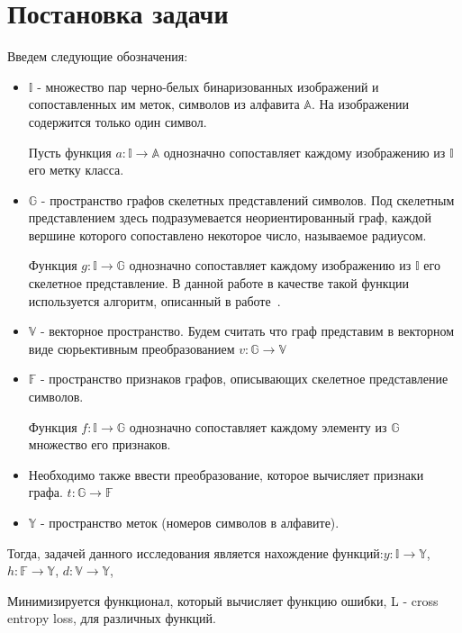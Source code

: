 \documentclass{llncs}
\begin{document}
\section{Постановка задачи}

Введем следующие обозначения: 
\begin{itemize}
\item $\mathbb{I}$ - множество пар черно-белых бинаризованных изображений и сопоставленных им меток, символов из алфавита $\mathbb{A}$. На изображении содержится только один символ. 

Пусть функция $a: \mathbb{I} \rightarrow \mathbb{A}$ однозначно сопоставляет каждому изображению из $\mathbb{I}$ его метку класса.

\item $\mathbb{G}$ - пространство графов скелетных представлений символов. Под скелетным представлением здесь подразумевается неориентированный граф, каждой вершине которого сопоставлено некоторое число, называемое радиусом.

Функция $g: \mathbb{I} \rightarrow \mathbb{G}$ однозначно сопоставляет каждому изображению из $\mathbb{I}$ его скелетное представление. В данной работе в качестве такой функции используется алгоритм, описанный в работе~\cite{cnn_1}.

\item $\mathbb{V}$ - векторное пространство. Будем считать что граф представим в векторном виде сюрьективным преобразованием $v: \mathbb{G} \rightarrow \mathbb{V}$

\item $\mathbb{F}$ - пространство признаков графов, описывающих скелетное представление символов.

Функция $f: \mathbb{I} \rightarrow \mathbb{G}$ однозначно сопоставляет каждому элементу из $\mathbb{G}$ множество его признаков.

\item Необходимо также ввести преобразование, которое вычисляет признаки графа. $t: \mathbb{G} \rightarrow \mathbb{F}$

\item $\mathbb{Y}$ - пространство меток (номеров символов в алфавите).
\end{itemize}

Тогда, задачей данного исследования является нахождение функций:$y: \mathbb{I} \rightarrow \mathbb{Y}$, $h: \mathbb{F} \rightarrow \mathbb{Y}$, $d: \mathbb{V} \rightarrow \mathbb{Y}$,
 
Минимизируется функционал, который вычисляет функцию ошибки, L - cross entropy loss, для различных функций.
\end{document}

